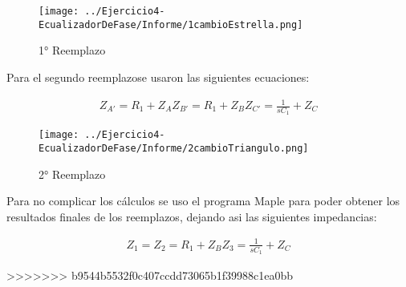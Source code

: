 \begin{figure}[h]
	\caption{1° Reemplazo}
	\centering
	\texttt{[image: ../Ejercicio4-EcualizadorDeFase/Informe/1cambioEstrella.png]}
	\label{1reemplazo} 
\end{figure}

Para el segundo reemplazose usaron las siguientes ecuaciones:

\begin{align}
	\begin{equation}
		Z_{A'}= R_1 + Z_{A}
	\end{equation}
	\begin{equation}
		Z_{B'}= R_1 + Z_{B}
	\end{equation}
	
	\begin{equation}
		Z_{C'}= \frac{1}{sC_1} + Z_{C}
	\end{equation}
\end{align}

\begin{figure}[h]
	\caption{2° Reemplazo}
	\centering
	\texttt{[image: ../Ejercicio4-EcualizadorDeFase/Informe/2cambioTriangulo.png]}
	\label{2reemplazo} 
\end{figure}


Para no complicar los cálculos se uso el programa Maple para poder obtener los resultados finales de los reemplazos, dejando asi las siguientes impedancias:

\begin{align}
	\begin{equation}
		Z_{1}= 
	\end{equation}
	\begin{equation}
		Z_{2}= R_1 + Z_{B}
	\end{equation}
	
	\begin{equation}
		Z_{3}= \frac{1}{sC_1} + Z_{C}
	\end{equation}
\end{align}




>>>>>>> b9544b5532f0c407ccdd73065b1f39988c1ea0bb